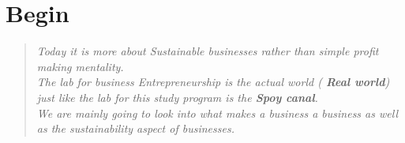 \section{Begin}
\begin{quote}
  \textit {Today it is more about Sustainable businesses rather than simple profit making
    mentality.}\\

  \textit {The lab for business Entrepreneurship is the actual world ( \textbf{Real world})
    just like the lab for this study program is the \textbf{Spoy canal}.}\\

  \textit{We are mainly going to look into what makes a business a business as well as the
    sustainability aspect of businesses.}
\end{quote}
